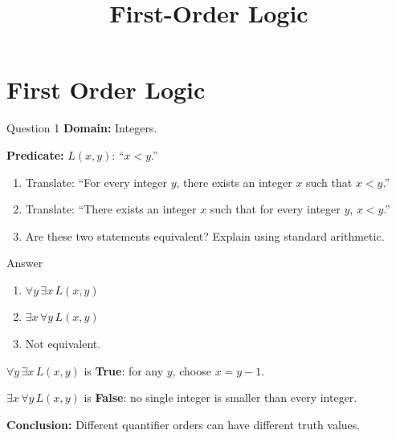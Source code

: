 \documentclass[aspectratio=169,11pt]{beamer}
\title{First-Order Logic}
\author{}
\date{}
\begin{document}
\section{First Order Logic}
\begin{frame}{Question 1}
\textbf{Domain:} Integers.

\textbf{Predicate:} $L(x,y)$: ``$x<y$.''

\begin{enumerate}
    \item Translate:
    ``For every integer $y$, there exists an integer $x$ such that $x<y$.''

    \item Translate:
    ``There exists an integer $x$ such that for every integer $y$,
    $x<y$.''

    \item Are these two statements equivalent? Explain using
    standard arithmetic.
\end{enumerate}

\begin{block}{Answer}
\begin{enumerate}
    \item $\forall y\,\exists x\,L(x,y)$
    \item $\exists x\,\forall y\,L(x,y)$
    \item Not equivalent.
\end{enumerate}

$\forall y\,\exists x\,L(x,y)$ is \textbf{True}: for any $y$, choose $x=y-1$.

$\exists x\,\forall y\,L(x,y)$ is \textbf{False}: no single integer is smaller than every integer.

\textbf{Conclusion:} Different quantifier orders can have different truth values.
\end{block}

\end{frame}
\end{document}
